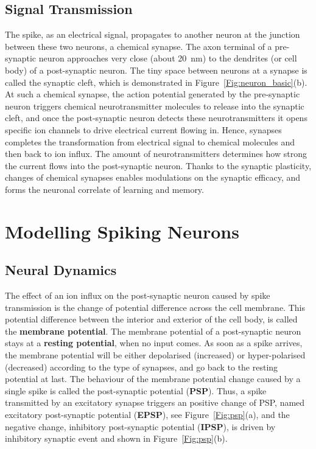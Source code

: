 \subsection{Signal Transmission}
\label{subsec:spike_trans}
The spike, as an electrical signal, propagates to another neuron at the junction between these two neurons, a chemical synapse.
The axon terminal of a pre-synaptic neuron approaches very close (about 20~nm) to the dendrites (or cell body) of a  post-synaptic neuron.
The tiny space between neurons at a synapse is called the synaptic cleft, which is demonstrated in Figure~\ref{Fig:neuron_basic}(b).
At such a chemical synapse, the action potential generated by the pre-synaptic neuron triggers chemical neurotransmitter molecules to release into the synaptic cleft, and once the post-synaptic neuron detects these neurotransmitters it opens specific ion channels to drive electrical current flowing in.
Hence, synapses completes the transformation from electrical signal to chemical molecules and then back to ion influx.
The amount of neurotransmitters determines how strong the current flows into the post-synaptic neuron.
Thanks to the synaptic plasticity, changes of chemical synapses enables modulations on the synaptic efficacy, and forms the neuronal correlate of learning and memory.

\section{Modelling Spiking Neurons}
\label{sec:spike}

\subsection{Neural Dynamics}
The effect of an ion influx on the post-synaptic neuron caused by spike transmission is the change of potential difference across the cell membrane.
This potential difference between the interior and exterior of the cell body, is called the \textbf{membrane potential}.
The membrane potential of a post-synaptic neuron stays at a \textbf{resting potential}, when no input comes.
As soon as a spike arrives, the membrane potential will be either depolarised (increased) or hyper-polarised (decreased) according to the type of synapses, and go back to the resting potential at last.
The behaviour of the membrane potential change caused by a single spike is called the post-synaptic potential (\textbf{PSP}). 
Thus, a spike transmitted by an excitatory synapse triggers an positive change of PSP, named excitatory post-synaptic potential (\textbf{EPSP}), see Figure~\ref{Fig:psp}(a), and the negative change, inhibitory post-synaptic potential (\textbf{IPSP}), is driven by inhibitory synaptic event and shown in Figure~\ref{Fig:psp}(b).


